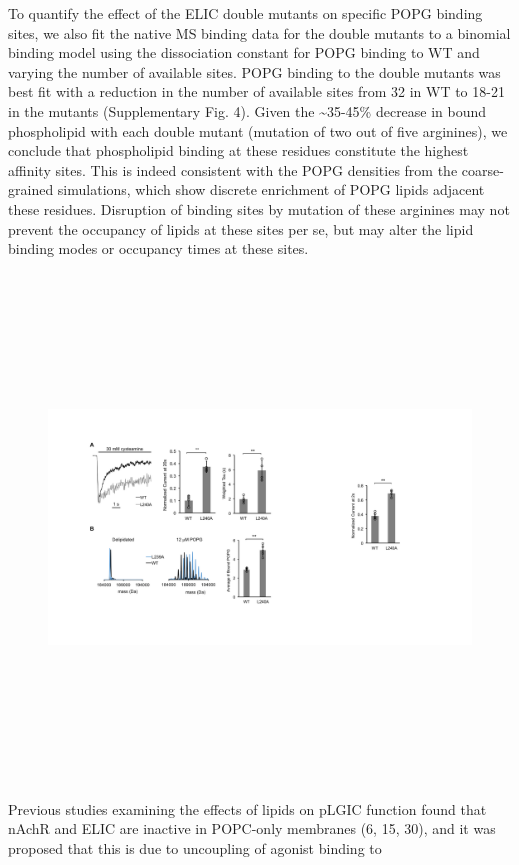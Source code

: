 To quantify the effect of the ELIC double mutants on specific POPG
binding sites, we also fit the native MS binding data for the double
mutants to a binomial binding model using the dissociation constant for
POPG binding to WT and varying the number of available sites. POPG
binding to the double mutants was best fit with a reduction in the
number of available sites from 32 in WT to 18-21 in the mutants
(Supplementary Fig. 4). Given the \textasciitilde{}35-45\% decrease in
bound phospholipid with each double mutant (mutation of two out of five
arginines), we conclude that phospholipid binding at these residues
constitute the highest affinity sites. This is indeed consistent with
the POPG densities from the coarse-grained simulations, which show
discrete enrichment of POPG lipids adjacent these residues. Disruption
of binding sites by mutation of these arginines may not prevent the
occupancy of lipids at these sites per se, but may alter the lipid
binding modes or occupancy times at these sites.
\begin{figure}
\includegraphics[width=5.93125in,height=5.29514in]{./pandoc_test/media/image9.pdf}
\end{figure}
Previous studies examining the effects of lipids on pLGIC function found
that nAchR and ELIC are inactive in POPC-only membranes (6, 15, 30), and
it was proposed that this is due to uncoupling of agonist binding to
